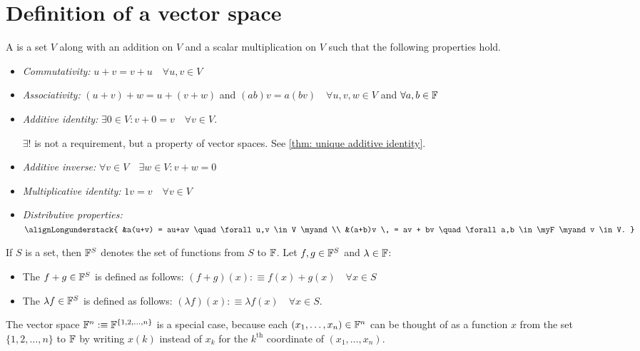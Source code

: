 \section{Definition of a vector space}

\setcounter{thm}{19}
\begin{mydef} 
  A  is a set $V$ along with an addition on $V$ and a scalar multiplication on $V$ such that the following properties hold.
  \begin{itemize}
    \item \emph{Commutativity:}
    $ u+v = v+u \quad \forall u,v \in V$
    \item \emph{Associativity:}
    $(u+v)+w=u+(v+w)$ and $(ab)v=a(bv) \quad \forall u,v,w \in V$ and $\forall a,b \in \mathbb{F}$
    \item \emph{Additive identity:}
    $\exists 0\in V:v+0=v \quad \forall v\in V$.

    $\exists!$ is not a requirement, but a property of vector spaces. See \ref{thm: unique additive identity}.
    \item \emph{Additive inverse:}
    $\forall v\in V \quad \exists w\in V: v+w=0$
    \item \emph{Multiplicative identity:}
    $1v = v \quad \forall v\in V$
    \item \emph{Distributive properties:}
    $
      \alignLongunderstack{
        &a(u+v) = au+av \quad \forall u,v \in V \myand  \\
        &(a+b)v \, = av + bv \quad \forall a,b \in \myF \myand v \in V.
      }
    $
  \end{itemize}
\end{mydef}

\setcounter{thm}{23}
\begin{mydef} 
  If $S$ is a set, then $\mathbb{F}^S$ denotes the set of functions from $S$ to $\mathbb{F}$. Let $f, g \in \mathbb{F}^{S}$ and $\lambda \in \mathbb{F}$:
  \begin{itemize}
    \item The  $f+g \in \mathbb{F}^{S}$ is defined as follows: $(f+g)(x) :\equiv f(x)+ g(x) \quad \forall x\in S$
    \item The  $\lambda f \in \mathbb{F}^{S}$ is defined as follows: $(\lambda f)(x) :\equiv \lambda f(x) \quad \forall x \in S$.
  \end{itemize}
  The vector space $\mathbb{F}^{n} :\equiv \mathbb{F}^{\{1,2,\dots,n\}}$ is a special case, because each $(x_1, \dots, x_n) \in \mathbb{F}^{n}$ can be thought of as a function $x$ from the set $\{1, 2, \dots, n\}$ to $\mathbb{F}$ by writing $x(k)$ instead of $x_k$ for the $k^{\text{th}}$ coordinate of $(x_1, \dots, x_n)$.
\end{mydef}

